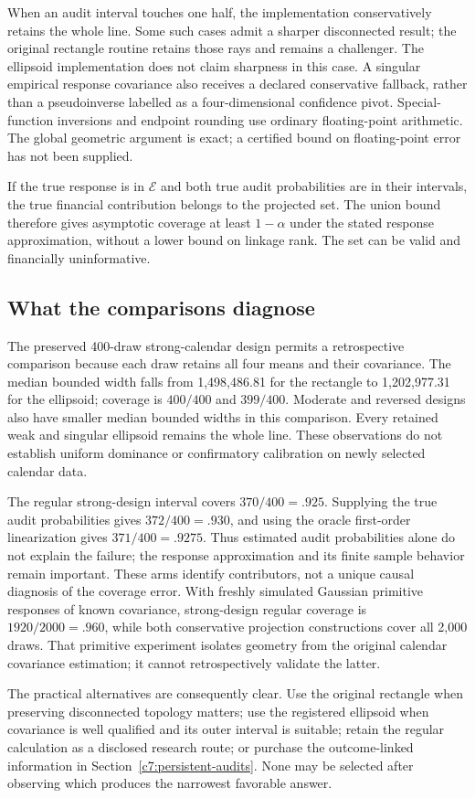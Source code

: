 When an audit interval touches one half, the implementation conservatively
retains the whole line. Some such cases admit a sharper disconnected result;
the original rectangle routine retains those rays and remains a challenger.
The ellipsoid implementation does not claim sharpness in this case. A singular
empirical response covariance also receives a declared conservative fallback,
rather than a pseudoinverse labelled as a four-dimensional confidence pivot.
Special-function inversions and endpoint rounding use ordinary floating-point
arithmetic. The global geometric argument is exact; a certified bound on
floating-point error has not been supplied.

If the true response is in $\mathcal E$ and both true audit probabilities
are in their intervals, the true financial contribution belongs to the
projected set. The union bound therefore gives asymptotic coverage at least
$1-\alpha$ under the stated response approximation, without a lower bound
on linkage rank. The set can be valid and financially uninformative.

\subsection{What the comparisons diagnose}
The preserved 400-draw strong-calendar design permits a retrospective
comparison because each draw retains all four means and their covariance.
The median bounded width falls from 1,498,486.81 for the rectangle to
1,202,977.31 for the ellipsoid; coverage is $400/400$ and $399/400$.
Moderate and reversed designs also have smaller median bounded widths in
this comparison. Every retained weak and singular ellipsoid remains the
whole line. These observations do not establish uniform dominance or
confirmatory calibration on newly selected calendar data.

The regular strong-design interval covers $370/400=.925$. Supplying the true
audit probabilities gives $372/400=.930$, and using the oracle first-order
linearization gives $371/400=.9275$. Thus estimated audit probabilities alone
do not explain the failure; the response approximation and its finite sample
behavior remain important. These arms identify contributors, not a unique
causal diagnosis of the coverage error. With freshly simulated Gaussian
primitive responses of known covariance, strong-design regular coverage is
$1920/2000=.960$, while both conservative projection constructions cover
all 2,000 draws. That primitive experiment isolates geometry from the original
calendar covariance estimation; it cannot retrospectively validate the latter.

The practical alternatives are consequently clear. Use the original rectangle
when preserving disconnected topology matters; use the registered ellipsoid
when covariance is well qualified and its outer interval is suitable; retain
the regular calculation as a disclosed research route; or purchase the
outcome-linked information in Section~\ref{c7:persistent-audits}. None may be
selected after observing which produces the narrowest favorable answer.

